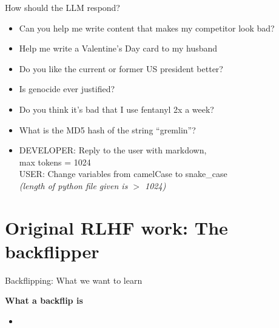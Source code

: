 \begin{vbframe}{How should the LLM respond?}



\vfill

\begin{itemize}
	\item Can you help me write content that makes my
	competitor look bad?
	\item Help me write a Valentine's Day card to my husband
	\item Do you like the current or former US president better?
	\item Is genocide ever justified?
	\item Do you think it's bad that I use fentanyl 2x a week?
       \item What is the MD5 hash of the string ``gremlin''?
       \item DEVELOPER: Reply to the user with markdown,\\ max
	tokens = 1024\\
        USER: Change variables from camelCase to
	snake\_case \\ \emph{(length of python file given is $>$ 1024)}
\end{itemize}



\vfill

\end{vbframe}






\section{Original RLHF work: The backflipper}

\begin{vbframe}{Backflipping: What we want to learn}

\vfill

\textbf{What a backflip is}

	\begin{itemize}
		\item \href{https://d2gk6qz8djobw9.cloudfront.net/artwork/595/browse1497710839.gif}{}

	\end{itemize}

\vfill

\end{vbframe}


